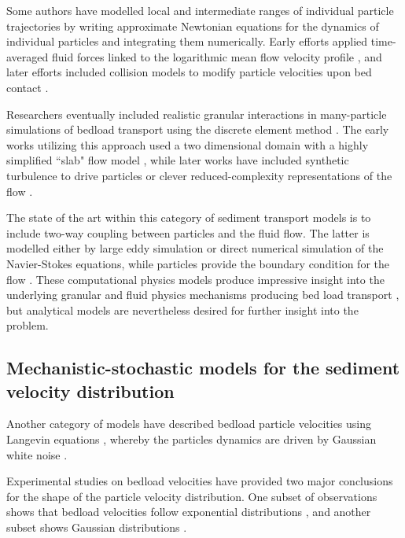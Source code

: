 Some authors have modelled local and intermediate ranges of individual particle trajectories by writing approximate Newtonian equations for the dynamics of individual particles and integrating them numerically. Early efforts applied time-averaged fluid forces linked to the logarithmic mean flow velocity profile \citep{Yalin1963,VanRijn1984}, and later efforts included collision models to modify particle velocities upon bed contact \citep{Wiberg1985,Sekine1992,Nino1998}.

Researchers eventually included realistic granular interactions in many-particle simulations of bedload transport using the discrete element method \citep{Cundall1979a, Haff1993}.
The early works utilizing this approach used a two dimensional domain with a highly simplified ``slab" flow model \citep{Haff1993}, while later works have included synthetic turbulence to drive particles \citep{McEwan2001,Schmeeckle2003,Maurin2015} or clever reduced-complexity representations of the flow \citep{Clark2015,Clark2017}.

The state of the art within this category of sediment transport models is to include two-way coupling between particles and the fluid flow. The latter is modelled either by large eddy simulation or direct numerical simulation of the Navier-Stokes equations, while particles provide the boundary condition for the flow \citep{Schmeeckle2014,Ji2013,Gonzalez2017,Vowinckel2014,Elghannay2017,Yousefi2020}.
These computational physics models produce impressive insight into the underlying granular and fluid physics mechanisms producing bed load transport \citep{Frey2011}, but analytical models are nevertheless desired for further insight into the problem.

\subsection{Mechanistic-stochastic models for the sediment velocity distribution}
\label{sec:langevin}

Another category of models have described bedload particle velocities using Langevin equations \citep{Ancey2014,Fan2014}, whereby the particles dynamics are driven by Gaussian white noise \citep{Kubo1978}.

Experimental studies on bedload velocities have provided two major conclusions for the shape of the particle velocity distribution. One subset of observations shows that bedload velocities follow exponential distributions \citep{Lajeunesse2010,Furbish2012,Fathel2015}, and another subset shows Gaussian distributions \citep{Martin2012,Ancey2014,Heyman2016}.

